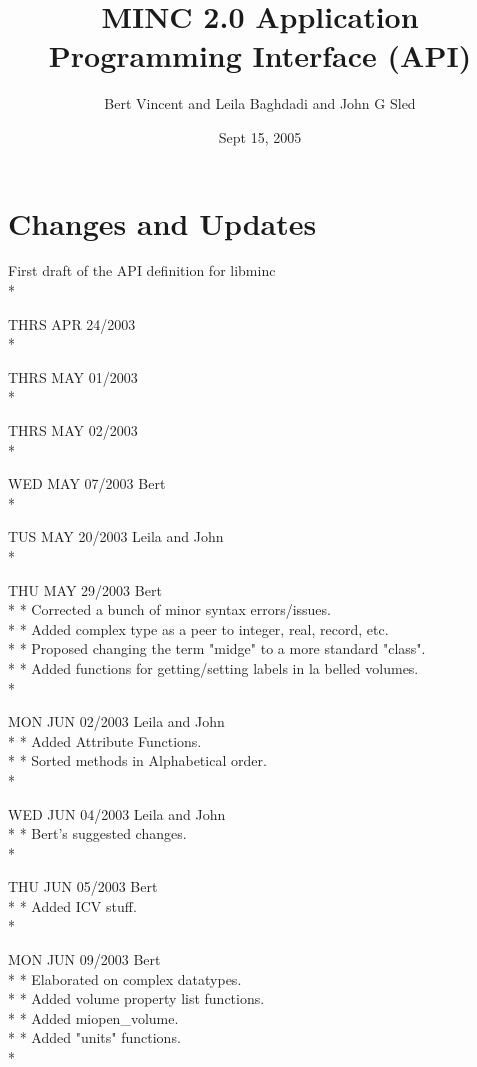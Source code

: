 \documentclass{article}
\title{MINC 2.0 Application Programming Interface (API)}
\author{Bert Vincent and Leila Baghdadi and John G Sled}
\date{Sept 15, 2005}
\begin{document}
\maketitle

\tableofcontents

\clearpage

\section{Changes and Updates}

First draft of the API definition for libminc\\*

THRS APR 24/2003\\*

THRS MAY 01/2003\\*

THRS MAY 02/2003\\*

WED  MAY 07/2003 Bert\\*

TUS  MAY 20/2003 Leila and John\\*

THU  MAY 29/2003 Bert\\*
* Corrected a bunch of minor syntax errors/issues.\\*
* Added complex type as a peer to integer, real, record, etc.\\*
* Proposed changing the term "midge" to a more standard "class".\\*
* Added functions for getting/setting labels in la belled volumes.\\*

MON  JUN 02/2003 Leila and John\\*
* Added Attribute Functions.\\*
* Sorted methods in Alphabetical order.\\*

WED  JUN 04/2003 Leila and John\\*
* Bert's suggested changes.\\*

THU  JUN 05/2003 Bert\\*
* Added ICV stuff.\\*

MON  JUN 09/2003 Bert\\*
* Elaborated on complex datatypes.\\*
* Added volume property list functions.\\*
* Added miopen\_volume.\\*
* Added "units" functions.\\*
\end{document}
